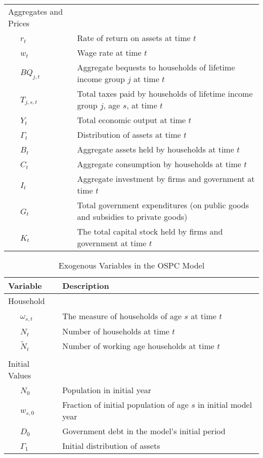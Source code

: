 \documentclass[letterpaper,12pt]{article}
\theoremstyle{definition}
\begin{document}
\begin{table}[h!]
\begin{tabular}{ll}
    Aggregates and Prices &  \\
    \ \ \ $r_{t}$ & Rate of return on assets at time $t$ \\
    \ \ \ $w_{t}$ & Wage rate at time $t$ \\
    \ \ \ $BQ_{j,t}$ & Aggregate bequests to households of lifetime income group $j$ at time $t$ \\
    \ \ \ $T_{j,s,t}$ & Total taxes paid by households of lifetime income group $j$, age $s$, at time $t$ \\
    \ \ \ $Y_{t}$ & Total economic output at time $t$ \\
    \ \ \ $\Gamma_{t}$ & Distribution of assets at time $t$ \\
    \ \ \ $B_{t}$ & Aggregate assets held by households at time $t$ \\
    \ \ \ $C_{t}$ & Aggregate consumption by households at time $t$ \\
    \ \ \ $I_{t}$ & Aggregate investment by firms and government at time $t$ \\
    \ \ \ $G_{t}$ & Total government expenditures (on public goods and subsidies to private goods) \\
    \ \ \ $K_{t}$ & The total capital stock held by firms and government at time $t$ \\
    \hline
    \hline
    \end{tabular}%
  \label{tab:addlabel}%
\end{table}%


\begin{table}[h!]
  \centering
  \caption{Exogenous Variables in the OSPC Model}
    \begin{tabular}{ll}
    \hline
    \hline
    Variable & Description \\
    \hline
    Household &  \\
    \ \ \ $\omega_{s,t}$ & The measure of households of age $s$ at time $t$ \\
    \ \ \ $N_{t}$ & Number of households at time $t$ \\
    \ \ \ $\tilde{N}_{t}$ & Number of working age households at time $t$ \\
          &  \\
    Initial Values &  \\
    \ \ \ $N_{0}$ & Population in initial year \\
    \ \ \ $w_{s,0}$ & Fraction of initial population of age $s$ in initial model year \\
    \ \ \ $D_{0}$ & Government debt in the model's initial period \\
    \ \ \ $\Gamma_{1}$ & Initial distribution of assets \\
    \hline
    \hline
    \end{tabular}%
  \label{tab:addlabel}%
\end{table}%
\end{document}
